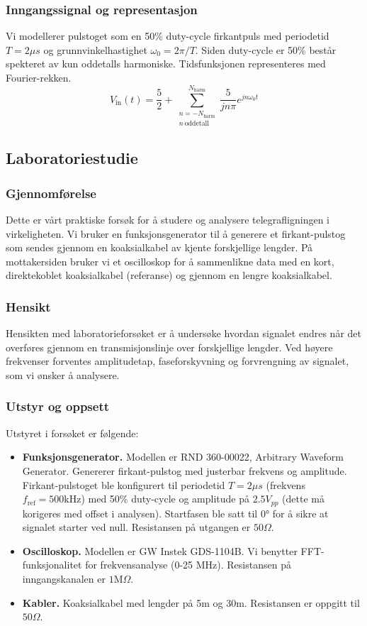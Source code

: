 \subsubsection{Inngangssignal og representasjon}
Vi modellerer pulstoget som en 50\% duty-cycle firkantpuls med periodetid $T = 2 \mu s$ og grunnvinkelhastighet $\omega_0 = 2\pi / T$. Siden duty-cycle er 50\% består spekteret av kun oddetalls harmoniske. Tidsfunksjonen representeres med Fourier-rekken.
\begin{equation}
    V_{\mathrm{in}}(t) = \frac{5}{2} + \sum_{\substack{n=-N_{\mathrm{harm}}\\ n\ \text{oddetall}}}^{N_{\mathrm{harm}}}\frac{5}{jn\pi} e^{jn\omega_0 t}
\end{equation} 
\clearpage

\subsection{Laboratoriestudie}
\subsubsection{Gjennomførelse} Dette er vårt praktiske forsøk for å studere og analysere telegrafligningen i virkeligheten. Vi bruker en funksjonsgenerator til å generere et firkant-pulstog som sendes gjennom en koaksialkabel av kjente forskjellige lengder. På mottakersiden bruker vi et oscilloskop for å sammenlikne data med en kort, direktekoblet koaksialkabel (referanse) og gjennom en lengre koaksialkabel.

\subsubsection{Hensikt} Hensikten med laboratorieforsøket er å undersøke hvordan signalet endres når det overføres gjennom en transmisjonslinje over forskjellige lengder. Ved høyere frekvenser forventes amplitudetap, faseforskyvning og forvrengning av signalet, som vi ønsker å analysere.
\subsubsection{Utstyr og oppsett}
Utstyret i forsøket er følgende:
\begin{itemize}
    \item \textbf{Funksjonsgenerator.} Modellen er RND 360-00022, Arbitrary Waveform Generator. Genererer firkant-pulstog med justerbar frekvens og amplitude. Firkant-pulstoget ble konfigurert til periodetid $T = 2 \mu s$ (frekvens $f_\mathrm{ref} = 500 \mathrm{kHz}$) med 50\% duty-cycle og amplitude på $2.5V_{pp}$ (dette må korigeres med offset i analysen). Startfasen ble satt til $0\si{\degree}$ for å sikre at signalet starter ved null. Resistansen på utgangen er $50 \Omega$.
    \item \textbf{Oscilloskop.} Modellen er GW Instek GDS-1104B. Vi benytter FFT-funksjonalitet for frekvensanalyse (0-25 MHz). Resistansen på inngangskanalen er $1 \mathrm{M}\Omega$.
    \item \textbf{Kabler.} Koaksialkabel med lengder på 5m og 30m. Resistansen er oppgitt til $50 \Omega$.
\end{itemize}


